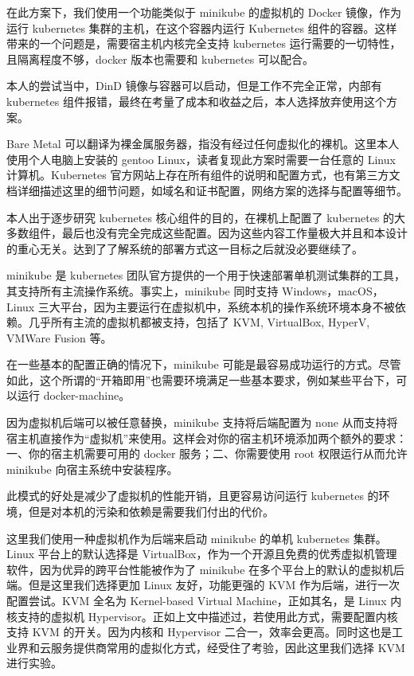 在此方案下，我们使用一个功能类似于 minikube 的虚拟机的 Docker 镜像，作为运行 kubernetes 集群的主机，在这个容器内运行 Kubernetes 组件的容器。这样带来的一个问题是，需要宿主机内核完全支持 kubernetes 运行需要的一切特性，且隔离程度不够，docker 版本也需要和 kubernetes 可以配合。

本人的尝试当中，DinD 镜像与容器可以启动，但是工作不完全正常，内部有 kubernetes 组件报错，最终在考量了成本和收益之后，本人选择放弃使用这个方案。


Bare Metal 可以翻译为裸金属服务器，指没有经过任何虚拟化的裸机。这里本人使用个人电脑上安装的 gentoo Linux，读者复现此方案时需要一台任意的 Linux 计算机。Kubernetes 官方网站上存在所有组件的说明和配置方式，也有第三方文档详细描述这里的细节问题，如域名和证书配置，网络方案的选择与配置等细节。

本人出于逐步研究 kubernetes 核心组件的目的，在裸机上配置了 kubernetes 的大多数组件，最后也没有完全完成这些配置。因为这些内容工作量极大并且和本设计的重心无关。达到了了解系统的部署方式这一目标之后就没必要继续了。



minikube 是 kubernetes 团队官方提供的一个用于快速部署单机测试集群的工具，其支持所有主流操作系统。事实上，minikube 同时支持 Windows，macOS，Linux 三大平台，因为主要运行在虚拟机中，系统本机的操作系统环境本身不被依赖。几乎所有主流的虚拟机都被支持，包括了 KVM, VirtualBox, HyperV, VMWare Fusion 等。

在一些基本的配置正确的情况下，minikube 可能是最容易成功运行的方式。尽管如此，这个所谓的“开箱即用”也需要环境满足一些基本要求，例如某些平台下，可以运行 docker-machine。

因为虚拟机后端可以被任意替换，minikube 支持将后端配置为 none 从而支持将宿主机直接作为“虚拟机”来使用。这样会对你的宿主机环境添加两个额外的要求：一、你的宿主机需要可用的 docker 服务；二、你需要使用 root 权限运行从而允许 minikube 向宿主系统中安装程序。

此模式的好处是减少了虚拟机的性能开销，且更容易访问运行 kubernetes 的环境，但是对本机的污染和依赖是需要我们付出的代价。


这里我们使用一种虚拟机作为后端来启动 minikube 的单机 kubernetes 集群。Linux 平台上的默认选择是 VirtualBox，作为一个开源且免费的优秀虚拟机管理软件，因为优异的跨平台性能被作为了 minikube 在多个平台上的默认的虚拟机后端。但是这里我们选择更加 Linux 友好，功能更强的 KVM 作为后端，进行一次配置尝试。KVM 全名为 Kernel-based Virtual Machine，正如其名，是 Linux 内核支持的虚拟机 Hypervisor。正如上文中描述过，若使用此方式，需要配置内核支持 KVM 的开关。因为内核和 Hypervisor 二合一，效率会更高。同时这也是工业界和云服务提供商常用的虚拟化方式，经受住了考验，因此这里我们选择 KVM 进行实验。

